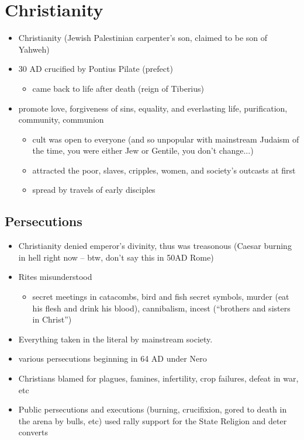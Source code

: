 \documentclass[12pt, twoside]{article}
\begin{document}
\section{Christianity}
\begin{itemize}
\item Christianity (Jewish Palestinian carpenter's son, claimed to be son of Yahweh)
\item 30 AD crucified by Pontius Pilate (prefect)
	\begin{itemize}
	\item came back to life after death (reign of Tiberius)
	\end{itemize}
\item promote love, forgiveness of sins, equality, and everlasting life, purification, community, communion 
	\begin{itemize}
	\item cult was open to everyone (and so unpopular with mainstream Judaism of the time, you were either Jew or Gentile, you don't change...)
	\item attracted the poor, slaves, cripples, women, and society’s outcasts at first
	\item spread by travels of early disciples
	\end{itemize}
\end{itemize}

\subsection{Persecutions}
\begin{itemize}
\item Christianity denied emperor's divinity, thus was treasonous (Caesar burning in hell right now – btw, don't say this in 50AD Rome)
\item Rites misunderstood
	\begin{itemize}
	\item secret meetings in catacombs, bird and fish secret symbols, murder (eat his flesh and drink his blood), cannibalism, incest (“brothers and sisters in Christ”)
	\end{itemize}
\item Everything taken in the literal by mainstream society.
\item various persecutions beginning in 64 AD under Nero
\item Christians blamed for plagues, famines, infertility, crop failures, defeat in war, etc
\item Public persecutions and executions (burning, crucifixion, gored to death in the arena by bulls, etc) used rally support for the State Religion and deter converts
\end{itemize}
\end{document}
